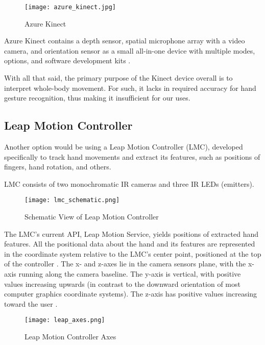 \begin{figure}[ht]
    \centering
    \texttt{[image: azure\_kinect.jpg]}
    \caption{Azure Kinect \cite{azurekinect_pic}}
    \label{fig:azureKincet}
\end{figure}

Azure Kinect contains a depth sensor, spatial microphone array with a video camera, and orientation sensor as a small all-in-one device with multiple modes, options, and software development kits \cite{azurekinect}.

With all that said, the primary purpose of the Kinect device overall is to interpret whole-body movement. For such, it lacks in required accuracy for hand gesture recognition, thus making it insufficient for our uses.

\subsection{Leap Motion Controller}

Another option would be using a Leap Motion Controller (LMC), developed specifically to track hand movements and extract its features, such as positions of fingers, hand rotation, and others.

LMC consists of two monochromatic IR cameras and three IR LEDs (emitters). 

\begin{figure}[H]
    \centering
    \texttt{[image: lmc\_schematic.png]}
    \caption{Schematic View of Leap Motion Controller \cite{LMCanalysis}}
    \label{fig:lmcScheme}
\end{figure}


The LMC's current API, Leap Motion Service, yields positions of extracted hand features. All the positional data about the hand and its features are represented in the coordinate system relative to the LMC's center point, positioned at the top of the controller \cite{LMCanalysis}. The x- and z-axes lie in the camera sensors plane, with the x-axis running along the camera baseline. The y-axis is vertical, with positive values increasing upwards (in contrast to the downward orientation of most computer graphics coordinate systems). The z-axis has positive values increasing toward the user \cite{tomasMultileap}.

\begin{figure}[ht]
    \centering
    \texttt{[image: leap\_axes.png]}
    \caption{Leap Motion Controller Axes \cite{tomasMultileap}}
    \label{fig:lmcAxes}
\end{figure}

